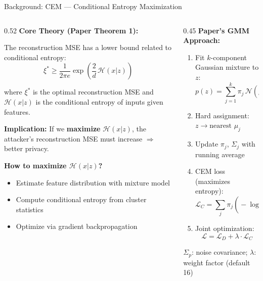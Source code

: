 \documentclass[aspectratio=169, 10pt]{beamer}
\begin{document}
\begin{frame}{Background: CEM --- Conditional Entropy Maximization}
\vspace{-0.15cm}

\begin{columns}[T]
\begin{column}{0.52\textwidth}
\textbf{Core Theory (Paper Theorem 1):}

\vspace{0.1cm}
\small
The reconstruction MSE has a lower bound related to conditional entropy:
\[ \xi^* \geq \frac{1}{2\pi e} \exp\!\left(\frac{2}{d}\,\mathcal{H}(x|z)\right) \]

where $\xi^*$ is the optimal reconstruction MSE and $\mathcal{H}(x|z)$ is the conditional entropy of inputs given features.

\vspace{0.1cm}
\textbf{Implication:} If we \textbf{maximize} $\mathcal{H}(x|z)$, the attacker's reconstruction MSE must increase $\Rightarrow$ better privacy.

\vspace{0.1cm}
\textbf{How to maximize $\mathcal{H}(x|z)$?}
\begin{itemize}\small\setlength{\itemsep}{0pt}
    \item Estimate feature distribution with mixture model
    \item Compute conditional entropy from cluster statistics
    \item Optimize via gradient backpropagation
\end{itemize}
\end{column}
\begin{column}{0.45\textwidth}
\textbf{Paper's GMM Approach:}

\vspace{0.1cm}
\small
\begin{enumerate}\setlength{\itemsep}{1pt}
    \item Fit $k$-component Gaussian mixture to $z$:
    \[ p(z) = \sum_{j=1}^{k} \pi_j \,\mathcal{N}(\mu_j, \Sigma_j) \]
    \item Hard assignment: $z \to \text{nearest } \mu_j$
    \item Update $\pi_j$, $\Sigma_j$ with running average
    \item CEM loss (maximizes entropy):
    \[ \mathcal{L}_C = \sum_{j} \pi_j\!\left(\!-\!\log\pi_j + \tfrac{1}{2}\log\tfrac{|\Sigma_j + \Sigma_p|}{|\Sigma_p|}\right) \]
    \item Joint optimization:
    \[ \mathcal{L} = \mathcal{L}_D + \lambda \cdot \mathcal{L}_C \]
\end{enumerate}
\vspace{0.05cm}
{\footnotesize $\Sigma_p$: noise covariance; $\lambda$: weight factor (default 16)}
\end{column}
\end{columns}

\end{frame}
\end{document}
